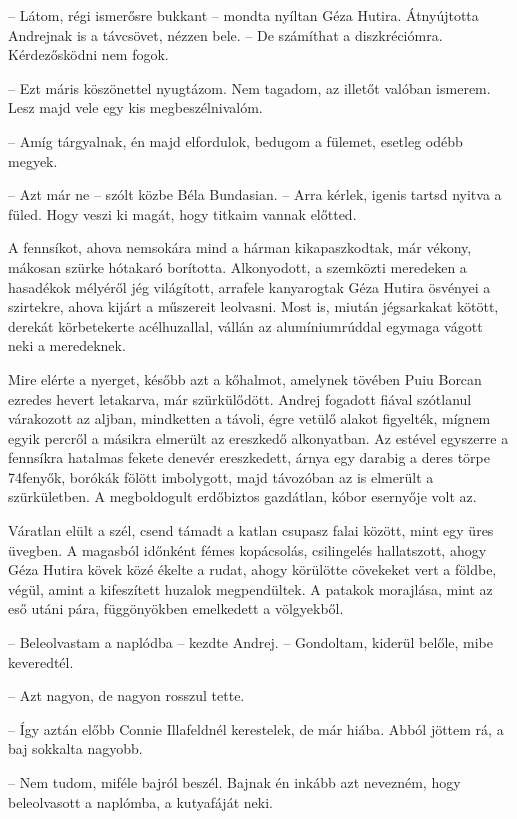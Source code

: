 \documentclass{IEEEtran}
\begin{document}
– Látom, régi ismerősre bukkant – mondta nyíltan Géza Hutira. Átnyújtotta
Andrejnak is a távcsövet, nézzen bele. – De számíthat a diszkréciómra.
Kérdezősködni nem fogok.

– Ezt máris köszönettel nyugtázom. Nem tagadom, az illetőt valóban ismerem.
Lesz majd vele egy kis megbeszélnivalóm.

– Amíg tárgyalnak, én majd elfordulok, bedugom a fülemet, esetleg odébb
megyek.

– Azt már ne – szólt közbe Béla Bundasian. – Arra kérlek, igenis tartsd nyitva
a füled. Hogy veszi ki magát, hogy titkaim vannak előtted.

A fennsíkot, ahova nemsokára mind a hárman kikapaszkodtak, már vékony, mákosan
szürke hótakaró borította. Alkonyodott, a szemközti meredeken a hasadékok
mélyéről jég világított, arrafele kanyarogtak Géza Hutira ösvényei a
szirtekre, ahova kijárt a műszereit leolvasni. Most is, miután jégsarkakat
kötött, derekát körbetekerte acélhuzallal, vállán az alumíniumrúddal egymaga
vágott neki a meredeknek.

Mire elérte a nyerget, később azt a kőhalmot, amelynek tövében Puiu Borcan
ezredes hevert letakarva, már szürkülődött. Andrej fogadott fiával szótlanul
várakozott az aljban, mindketten a távoli, égre vetülő alakot figyelték,
mígnem egyik percről a másikra elmerült az ereszkedő alkonyatban. Az estével
egyszerre a fennsíkra hatalmas fekete denevér ereszkedett, árnya egy darabig a
deres törpe 74fenyők, borókák fölött imbolygott, majd távozóban az is elmerült
a szürkületben. A megboldogult erdőbiztos gazdátlan, kóbor esernyője volt az.

Váratlan elült a szél, csend támadt a katlan csupasz falai között, mint egy
üres üvegben. A magasból időnként fémes kopácsolás, csilingelés hallatszott,
ahogy Géza Hutira kövek közé ékelte a rudat, ahogy körülötte cövekeket vert a
földbe, végül, amint a kifeszített huzalok megpendültek. A patakok morajlása,
mint az eső utáni pára, függönyökben emelkedett a völgyekből.

– Beleolvastam a naplódba – kezdte Andrej. – Gondoltam, kiderül belőle, mibe
keveredtél.

– Azt nagyon, de nagyon rosszul tette.

– Így aztán előbb Connie Illafeldnél kerestelek, de már hiába. Abból jöttem
rá, a baj sokkalta nagyobb.

– Nem tudom, miféle bajról beszél. Bajnak én inkább azt nevezném, hogy
beleolvasott a naplómba, a kutyafáját neki.
\end{document}
